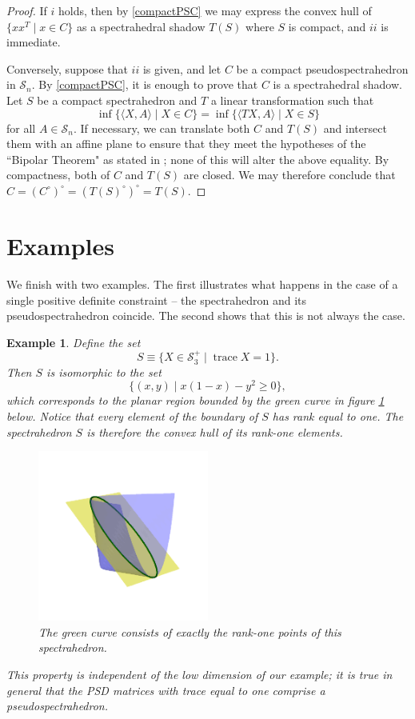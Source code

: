 \documentclass[11pt]{article} %
\newtheorem{examp}[thm]{Example}
\newcommand{\s}{\mathcal{S}}
\DeclareMathOperator{\trace}{trace}
\begin{document}
\begin{proof}
If $i$ holds, then by \ref{compactPSC} we may express the convex hull of $\{xx^T \mid x \in  C\}$ as a spectrahedral shadow $T(S)$ where $S$ is compact, and $ii$ is immediate.

Conversely, suppose that $ii$ is given, and let $C$ be a compact pseudospectrahedron in $\s_n$. By \ref{compactPSC}, it is enough to prove that $C$ is a spectrahedral shadow. Let $S$ be a compact spectrahedron and $T$ a linear transformation such that
\[ \inf\{ \langle X, A\rangle \mid X \in C \} = \inf \{\langle TX, A \rangle \mid X \in S\} \]
for all $A \in \s_ n$. If necessary, we can translate both $C$ and $T(S)$ and intersect them with an affine plane to ensure that they meet the hypotheses of the ``Bipolar Theorem" as stated in \cite{Barvinok}; none of this will alter the above equality. By compactness, both of $C$ and $T(S)$ are closed. We may therefore conclude that $C =(C^\circ)^\circ=(T(S)^\circ)^\circ = T(S)$.
\end{proof}


\section{Examples}
We finish with two examples. The first illustrates what happens in the case of a single positive definite constraint -- the spectrahedron and its pseudospectrahedron coincide. The second shows that this is not always the case. 

\begin{examp}
Define the set
\[S \equiv \{X\in \s_3^+ \mid \trace X = 1\}. \]
Then $S$ is isomorphic to the set 
\[\{(x,y) \mid x(1-x)-y^2 \geq 0\},\]
which corresponds to the planar region bounded by the green curve in figure \ref{2d} below. Notice that every element of the boundary of $S$ has rank equal to one. The spectrahedron $S$ is therefore the convex hull of its rank-one elements.
\begin{figure}[H]

   \begin{center}
    \includegraphics[width=0.5\textwidth]{2dSpect2.png}
    \caption{The green curve consists of exactly the rank-one points of this spectrahedron.}
    \label{2d}
  \end{center}
\end{figure}
This property is independent of the low dimension of our example; it is true in general that the PSD matrices with trace equal to one comprise a pseudospectrahedron.
\end{examp}
\end{document}
